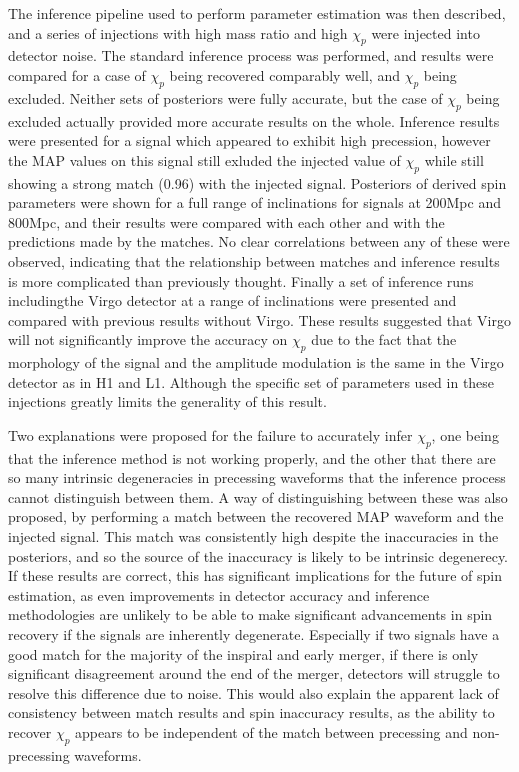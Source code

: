 \documentclass[11pt]{article}
\begin{document}
The inference pipeline used to perform parameter estimation was then described, and a series of injections with high mass ratio and high $\chi_p$ were injected into detector noise. The standard inference process was performed, and results were compared for a case of $\chi_p$ being recovered comparably well, and $\chi_p$ being excluded. Neither sets of posteriors were fully accurate, but the case of $\chi_p$ being excluded actually provided more accurate results on the whole. Inference results were presented for a signal which appeared to exhibit high precession, however the MAP values on this signal still exluded the injected value of $\chi_p$ while still showing a strong match (0.96) with the injected signal. Posteriors of derived spin parameters were shown for a full range of inclinations for signals at 200Mpc and 800Mpc, and their results were compared with each other and with the predictions made by the matches. No clear correlations between any of these were observed, indicating that the relationship between matches and inference results is more complicated than previously thought. Finally a set of inference runs includingthe Virgo detector at a range of inclinations were presented and compared with previous results without Virgo. These results suggested that Virgo will not significantly improve the accuracy on $\chi_p$ due to the fact that the morphology of the signal and the amplitude modulation is the same in the Virgo detector as in H1 and L1. Although the specific set of parameters used in these injections greatly limits the generality of this result.


Two explanations were proposed for the failure to accurately infer $\chi_p$, one being that the inference method is not working properly, and the other that there are so many intrinsic degeneracies in precessing waveforms that the inference process cannot distinguish between them. A way of distinguishing between these was also proposed, by performing a match between the recovered MAP waveform and the injected signal. This match was consistently high despite the inaccuracies in the posteriors, and so the source of the inaccuracy is likely to be intrinsic degenerecy. If these results are correct, this has significant implications for the future of spin estimation, as even improvements in detector accuracy and inference methodologies are unlikely to be able to make significant advancements in spin recovery if the signals are inherently degenerate. Especially if two signals have a good match for the majority of the inspiral and early merger, if there is only significant disagreement around the end of the merger, detectors will struggle to resolve this difference due to noise. This would also explain the apparent lack of consistency between match results and spin inaccuracy results, as the ability to recover $\chi_p$ appears to be independent of the match between precessing and non-precessing waveforms.
\end{document}
